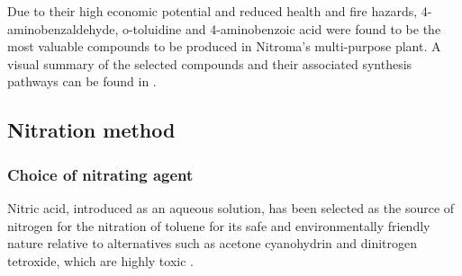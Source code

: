 Due to their high economic potential and reduced health and fire hazards, 4-aminobenzaldehyde, o-toluidine and 4-aminobenzoic acid were found to be the most valuable compounds to be produced in Nitroma's multi-purpose plant.  A visual summary of the selected compounds and their associated synthesis pathways can be found in .


\subsection{Nitration method}
\subsubsection{Choice of nitrating agent}
Nitric acid, introduced as an aqueous solution, has been selected as the source of nitrogen for the nitration of toluene for its safe and environmentally friendly nature relative to alternatives such as acetone cyanohydrin and dinitrogen tetroxide, which are highly toxic \cite{miller_kinetics_1964,dagade_nitration_2002, sreedhar_scientific_2013}. 



\begin{comment}
Nitric acid has been selected as the source of nitrogen for the nitration of toluene for its safe and environmentally friendly nature relative to other possible nitrating agents, high availability, and its various favourable properties \cite{miller_kinetics_1964, sreedhar_scientific_2013}. Although nitric acid is a highly acidic and volatile compound, compared to alternatives such as acetone cyanohydrin and dinitrogen tetroxide which are highly toxic, nitric acid is more appropriate for industrial-scale nitration of toluene \cite{dagade_nitration_2002, sreedhar_scientific_2013}. Nitric acid, introduced as an aqueous solution, is the most commonly used and well-studied nitrating agent for this process in industry. \cite{bowers_toluidines_2000} A big advantage of aqueous nitric acid is that it can act as a self-catalyst by self-donating protons. \cite{miller_kinetics_1964} A common alternative to nitric acid is acetyl nitrate which is formed by the reaction of nitric acid with acetic anhydride. \cite{vassena_selective_1999} This reaction yields formic acid as by-product, resulting in a lower atom economy; it also causes unnecessary difficulties in separations downstream by introducing three extra components: acetyl nitrate, acetic anhydride, and formic acid. The same argument can be employed for other alkyl nitrates such as butyl nitrate. To this end, nitric acid is deemed as the most suitable choice among all candidates.
\end{comment}

